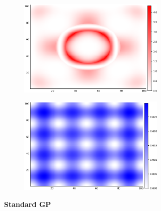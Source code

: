 \documentclass{article}
\begin{document}
\begin{figure}
		\centering
		\captionsetup{justification=centering}
    \begin{subfigure}[b]{.5\textwidth}
      \centering
      \begin{subfigure}[b]{.5\textwidth}
        \includegraphics[scale=0.27]{figures/heatmaps/error-noder-25.png}
      \end{subfigure}%
      \begin{subfigure}[b]{.5\textwidth}
        \includegraphics[scale=0.27]{figures/heatmaps/variance-noder-25.png}
      \end{subfigure}
      \caption{\textbf{Standard GP}}
    \end{subfigure}%
    \begin{subfigure}[b]{.5\textwidth}
      \centering
      \begin{subfigure}[b]{.5\textwidth}
        \centering

\end{subfigure}
\end{subfigure}
\end{figure}
\end{document}
